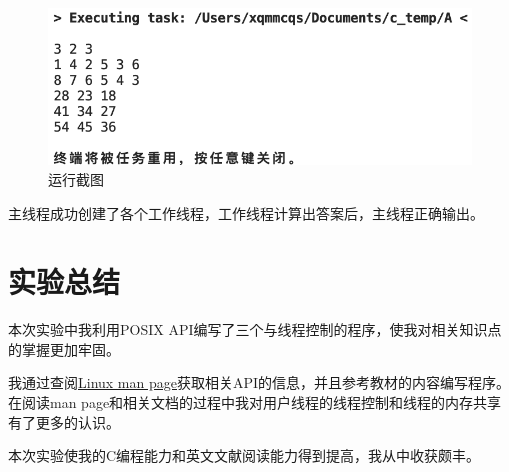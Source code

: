 \documentclass[lang=cn,11pt,a4paper,cite=authornum]{paper}
\begin{document}
\begin{figure}[htbp]

    \centering
    \includegraphics[width=0.6\linewidth]{./images/running.png}
    \caption{运行截图}

\end{figure}

主线程成功创建了各个工作线程，工作线程计算出答案后，主线程正确输出。

\section{实验总结}

本次实验中我利用POSIX API编写了三个与线程控制的程序，使我对相关知识点的掌握更加牢固。

我通过查阅\href{https://man7.org/linux/man-pages/index.html}{Linux man page}获取相关API的信息，并且参考教材的内容编写程序。在阅读man page和相关文档的过程中我对用户线程的线程控制和线程的内存共享有了更多的认识。

本次实验使我的C编程能力和英文文献阅读能力得到提高，我从中收获颇丰。
\end{document}
